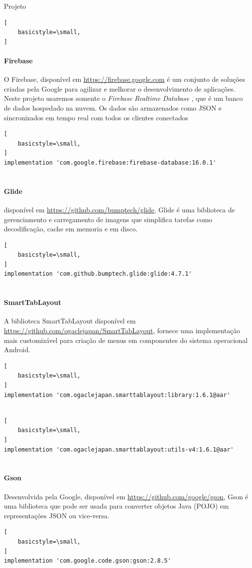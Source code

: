 \documentclass[
	12pt,				%
	openright,			%
	twoside,			%
	a4paper,			%
	english,			%
	french,				%
	spanish,			%
	brazil				%
	]{abntex2}
\begin{document}
\begin{chapter}{Projeto}
\begin{lstlisting}[
    basicstyle=\small,
]
\end{lstlisting}
   \paragraph{Firebase}
O Firebase, disponível em \url{https://firebase.google.com} é um conjunto de soluções criadas pela Google para agilizar e melhorar o desenvolvimento de aplicações. Neste projeto usaremos somente o \textit{Firebase Realtime Database} , que é um banco de dados hospedado na nuvem. Os dados são armazenados como JSON e sincronizados em tempo real com todos os clientes conectados
        \begin{lstlisting}[
    basicstyle=\small,
]
implementation 'com.google.firebase:firebase-database:16.0.1'
  
\end{lstlisting}
\newpage
   \paragraph{Glide}
   disponível em \url{https://github.com/bumptech/glide}, Glide é uma biblioteca de gerenciamento e carregamento de imagens 
que simplifica tarefas como decodificação, cache em memoria e em disco. 
        \begin{lstlisting}[
    basicstyle=\small,
]
implementation 'com.github.bumptech.glide:glide:4.7.1'
  
\end{lstlisting}
   \paragraph{SmartTabLayout}
   A biblioteca SmartTabLayout disponível em \url{https://github.com/ogaclejapan/SmartTabLayout}, fornece uma implementação mais customizável 
para criação de menus em componentes do sistema operacional Android.
         \begin{lstlisting}[
    basicstyle=\small,
]
implementation 'com.ogaclejapan.smarttablayout:library:1.6.1@aar'
   
\end{lstlisting}
        \begin{lstlisting}[
    basicstyle=\small,
]
implementation 'com.ogaclejapan.smarttablayout:utils-v4:1.6.1@aar'
   
\end{lstlisting}
   \paragraph{Gson}
   Desenvolvida pela Google, disponível em \url{https://github.com/google/gson}, Gson é uma biblioteca que pode ser usada para converter objetos Java (POJO) em representações JSON ou vice-versa.
         \begin{lstlisting}[
    basicstyle=\small,
]
implementation 'com.google.code.gson:gson:2.8.5'
    

\end{lstlisting}
\end{chapter}
\end{document}
